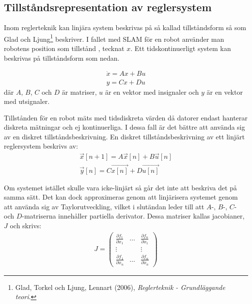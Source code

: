 \documentclass[a4paper,12pt,fleqn]{article}
\begin{document}
\newpage

\subsection{Tillståndsrepresentation av reglersystem}

Inom reglerteknik kan linjära system beskrivas på så kallad tillståndsform så som Glad och Ljung\footnote{Glad, Torkel och Ljung, Lennart (2006), \textit{Reglerteknik - Grundläggande teori}.} beskriver. I fallet med SLAM för en robot använder man robotens position som tillstånd , tecknat $x$. Ett tidskontinuerligt system kan beskrivas på tillståndsform som nedan.

\begin{gather}
\dot{x}=Ax+Bu \\
y=Cx+Du	
\label{equ:tillstand}
\end{gather}
där $A$, $B$, $C$ och $D$ är matriser, $u$ är en vektor med insignaler och $y$ är en vektor med utsignaler.

Tillstånden för en robot mäts med tidsdiskreta värden då datorer endast hanterar diskreta mätningar och ej kontinuerliga. I dessa fall är det bättre att använda sig av en diskret tillståndsbeskrivning. En diskret tillståndsbeskrivning av ett linjärt reglersystem beskrivs av: 
\begin{gather}
\vec{x}[n+1] = A\vec{x}[n] + B\vec{u}[n] \\
\vec{y}[n] = C\vec{x[n]} + D\vec{u[n]}
\end{gather}

Om systemet istället skulle vara icke-linjärt så går det inte att beskriva det på samma sätt. Det kan dock approximeras genom att linjärisera systemet genom att använda sig av Taylorutveckling, vilket i slutändan leder till att $A$-, $B$-, $C$- och $D$-matriserna innehåller partiella derivator. Dessa matriser kallas jacobianer, $J$ och skrivs:
\begin{gather}
	J= \begin{pmatrix}
	\frac{\partial f_1}{\partial x_1} & \dots & \frac{\partial f_n}{\partial x_1} \\
	  							\vdots &       & \vdots \\
	  \frac{\partial f_1}{\partial x_n} & \dots & \frac{\partial f_n}{\partial x_n}
	  \end{pmatrix}
\end{gather}
\end{document}

